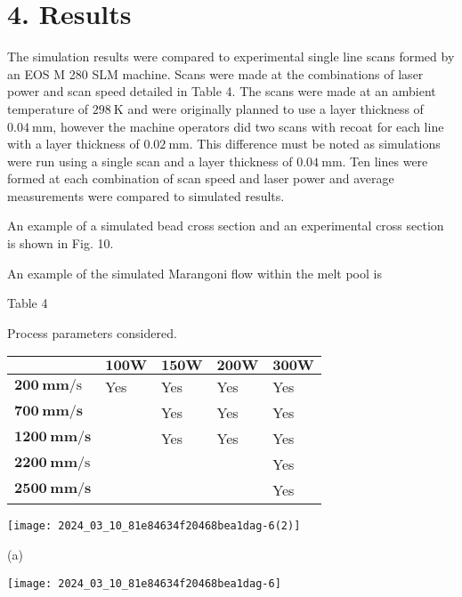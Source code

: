 \documentclass[10pt]{article}
\begin{document}
\section*{4. Results}
The simulation results were compared to experimental single line scans formed by an EOS M 280 SLM machine. Scans were made at the combinations of laser power and scan speed detailed in Table 4. The scans were made at an ambient temperature of $298 \mathrm{~K}$ and were originally planned to use a layer thickness of $0.04 \mathrm{~mm}$, however the machine operators did two scans with recoat for each line with a layer thickness of $0.02 \mathrm{~mm}$. This difference must be noted as simulations were run using a single scan and a layer thickness of $0.04 \mathrm{~mm}$. Ten lines were formed at each combination of scan speed and laser power and average measurements were compared to simulated results.

An example of a simulated bead cross section and an experimental cross section is shown in Fig. 10.

An example of the simulated Marangoni flow within the melt pool is

Table 4

Process parameters considered.

\begin{center}
\begin{tabular}{lllll}
\hline
 & $\mathbf{1 0 0} \mathbf{W}$ & $\mathbf{1 5 0} \mathbf{W}$ & $\mathbf{2 0 0} \mathbf{W}$ & $\mathbf{3 0 0} \mathbf{W}$ \\
\hline
$\mathbf{2 0 0} \mathbf{~ m m} / \mathrm{s}$ & Yes & Yes & Yes & Yes \\
$\mathbf{7 0 0} \mathbf{~ m m} / \mathbf{s}$ &  & Yes & Yes & Yes \\
$\mathbf{1 2 0 0} \mathbf{~ m m} / \mathbf{s}$ &  & Yes & Yes & Yes \\
$\mathbf{2 2 0 0} \mathbf{~ m m} / \mathrm{s}$ &  &  &  & Yes \\
$\mathbf{2 5 0 0} \mathbf{~ m m} / \mathbf{s}$ &  &  &  & Yes \\
\hline
\end{tabular}
\end{center}

\begin{center}
\texttt{[image: 2024\_03\_10\_81e84634f20468bea1dag-6(2)]}
\end{center}

(a)

\begin{center}
\texttt{[image: 2024\_03\_10\_81e84634f20468bea1dag-6]}
\end{center}
\end{document}
